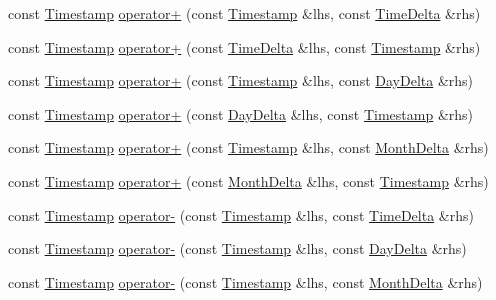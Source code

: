 \begin{DoxyCompactItemize}
\item 
const \hyperlink{structTimestamp}{\-Timestamp} \hyperlink{structTimestamp_a5eb71bec7edce3a62bfc8ad803217d81}{operator+} (const \hyperlink{structTimestamp}{\-Timestamp} \&lhs, const \hyperlink{structTimeDelta}{\-Time\-Delta} \&rhs)
\item 
const \hyperlink{structTimestamp}{\-Timestamp} \hyperlink{structTimestamp_afd358fc0636aff7726ab1e4de62996b1}{operator+} (const \hyperlink{structTimeDelta}{\-Time\-Delta} \&lhs, const \hyperlink{structTimestamp}{\-Timestamp} \&rhs)
\item 
const \hyperlink{structTimestamp}{\-Timestamp} \hyperlink{structTimestamp_a4d4956a556c01ac7b2d80f2c6ad92169}{operator+} (const \hyperlink{structTimestamp}{\-Timestamp} \&lhs, const \hyperlink{structDayDelta}{\-Day\-Delta} \&rhs)
\item 
const \hyperlink{structTimestamp}{\-Timestamp} \hyperlink{structTimestamp_a4f128e0c1107521f675cb6abe80d59be}{operator+} (const \hyperlink{structDayDelta}{\-Day\-Delta} \&lhs, const \hyperlink{structTimestamp}{\-Timestamp} \&rhs)
\item 
const \hyperlink{structTimestamp}{\-Timestamp} \hyperlink{structTimestamp_a7c3166a1ae2467926edcf656bbb70e6a}{operator+} (const \hyperlink{structTimestamp}{\-Timestamp} \&lhs, const \hyperlink{structMonthDelta}{\-Month\-Delta} \&rhs)
\item 
const \hyperlink{structTimestamp}{\-Timestamp} \hyperlink{structTimestamp_a6e9c1b339f7e957af5e04a6dbf060d73}{operator+} (const \hyperlink{structMonthDelta}{\-Month\-Delta} \&lhs, const \hyperlink{structTimestamp}{\-Timestamp} \&rhs)
\item 
const \hyperlink{structTimestamp}{\-Timestamp} \hyperlink{structTimestamp_abcd43fa9dc1d93330d1145200de6304f}{operator-\/} (const \hyperlink{structTimestamp}{\-Timestamp} \&lhs, const \hyperlink{structTimeDelta}{\-Time\-Delta} \&rhs)
\item 
const \hyperlink{structTimestamp}{\-Timestamp} \hyperlink{structTimestamp_a04c185ab523199b38a5bdaeaab34fd2b}{operator-\/} (const \hyperlink{structTimestamp}{\-Timestamp} \&lhs, const \hyperlink{structDayDelta}{\-Day\-Delta} \&rhs)
\item 
const \hyperlink{structTimestamp}{\-Timestamp} \hyperlink{structTimestamp_abfaf8665e29b7253bd93d567065f09f6}{operator-\/} (const \hyperlink{structTimestamp}{\-Timestamp} \&lhs, const \hyperlink{structMonthDelta}{\-Month\-Delta} \&rhs)
\item 

\end{DoxyCompactItemize}
